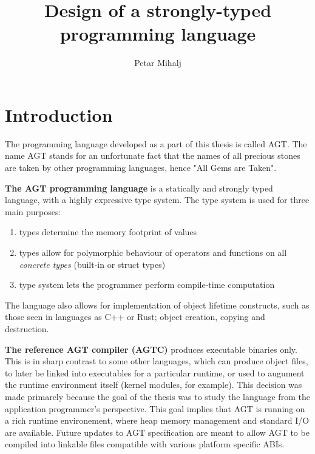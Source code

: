 \documentclass[times, utf8, diplomski]{fer}
\theoremstyle{definition}
\begin{document}

\title{Design of a strongly-typed programming language}

\author{Petar Mihalj}

\maketitle




\tableofcontents

\chapter{Introduction}

The programming language developed as a part of this thesis is called AGT.
The name AGT stands for an unfortunate fact that the names of all precious stones
are taken by other programming languages, hence "All Gems are Taken".

\textbf{The AGT programming language} is a statically and 
strongly typed language, with a highly expressive type system.
The type system is used for three main purposes:

\begin{enumerate}
    \item types determine the memory footprint of values 
    \item types allow for polymorphic behaviour of operators and functions on all 
        \textit{concrete types} (built-in or struct types)
    \item type system lets the programmer perform compile-time computation
\end{enumerate}

The language also allows for implementation of object lifetime constructs, 
such as those seen in languages as C++ or Rust; object creation, copying and destruction.

\textbf{The reference AGT compiler (AGTC)} produces executable binaries only.
This is in sharp contrast to some other languages, which can produce object files, 
to later be linked into executables for a particular runtime, 
or used to augument the runtime environment itself (kernel modules, for example). 
This decision was made primarely because the goal of the thesis was to study the language 
from the application programmer's perspective. 
This goal implies that AGT is running on a rich runtime environement, 
where heap memory management and standard I/O are available.
Future updates to AGT specification are meant to allow AGT to be compiled
into linkable files compatible with various platform specific ABIs.
\end{document}
